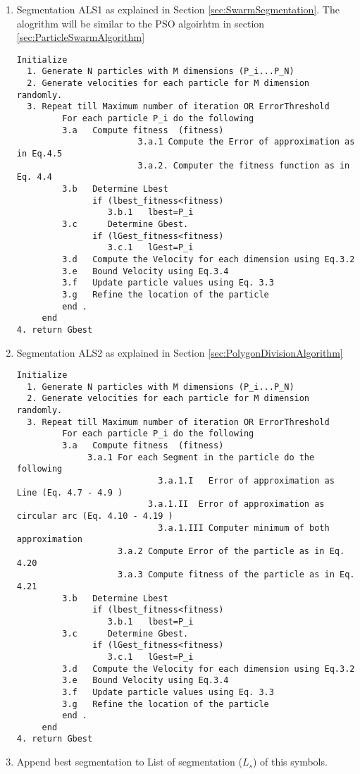 \begin{enumerate}
\item Segmentation ALS1 as explained in Section \ref{sec:SwarmSegmentation}. The alogrithm will be similar to the PSO algoirhtm  in section \ref{sec:ParticleSwarmAlgorithm} 
\begin{verbatim}
Initialize 
  1. Generate N particles with M dimensions (P_i...P_N) 
  2. Generate velocities for each particle for M dimension randomly. 
  3. Repeat till Maximum number of iteration OR ErrorThreshold  
         For each particle P_i do the following 
         3.a   Compute fitness  (fitness) 
         				3.a.1 Compute the Error of approximation as in Eq.4.5
         				3.a.2. Computer the fitness function as in Eq. 4.4 
         3.b   Determine Lbest  
               if (lbest_fitness<fitness)
                  3.b.1   lbest=P_i
         3.c      Determine Gbest.
               if (lGest_fitness<fitness)
                  3.c.1   lGest=P_i
         3.d   Compute the Velocity for each dimension using Eq.3.2 
         3.e   Bound Velocity using Eq.3.4
         3.f   Update particle values using Eq. 3.3
         3.g   Refine the location of the particle 
         end .
     end 
4. return Gbest
\end{verbatim}	
\item Segmentation ALS2  as explained in Section \ref{sec:PolygonDivisionAlgorithm}
\begin{verbatim}
Initialize 
  1. Generate N particles with M dimensions (P_i...P_N) 
  2. Generate velocities for each particle for M dimension randomly. 
  3. Repeat till Maximum number of iteration OR ErrorThreshold  
         For each particle P_i do the following 
         3.a   Compute fitness  (fitness) 
              3.a.1 For each Segment in the particle do the following
         				    3.a.1.I   Error of approximation as Line (Eq. 4.7 - 4.9 )
         			      3.a.1.II  Error of approximation as circular arc (Eq. 4.10 - 4.19 )
         				    3.a.1.III Computer minimum of both approximation 
         			3.a.2 Compute Error of the particle as in Eq.  4.20
         			3.a.3 Compute fitness of the particle as in Eq. 4.21
         3.b   Determine Lbest  
               if (lbest_fitness<fitness)
                  3.b.1   lbest=P_i
         3.c      Determine Gbest.
               if (lGest_fitness<fitness)
                  3.c.1   lGest=P_i
         3.d   Compute the Velocity for each dimension using Eq.3.2 
         3.e   Bound Velocity using Eq.3.4
         3.f   Update particle values using Eq. 3.3
         3.g   Refine the location of the particle 
         end .
     end 
4. return Gbest
\end{verbatim}	
\item Append best segmentation to List of segmentation ($L_s$) of this symbols. 
\end{enumerate}

